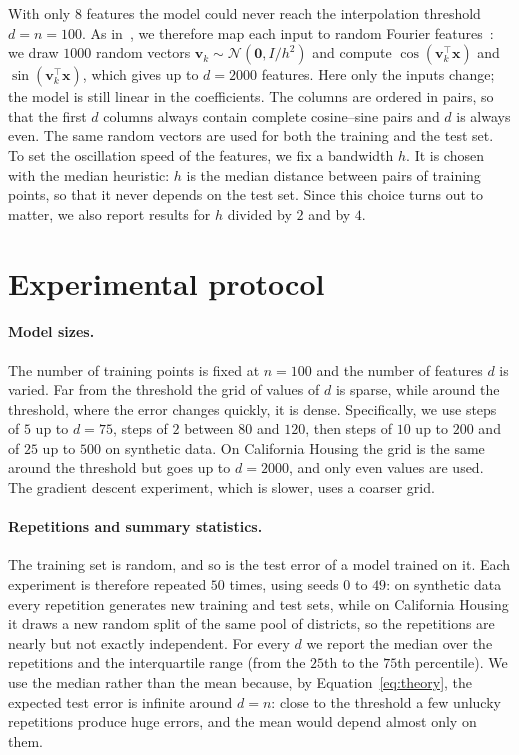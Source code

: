 \documentclass[11pt,a4paper]{article}
\begin{document}
With only $8$ features the model could never reach the interpolation
threshold $d = n = 100$. As in~\cite{belkin2019reconciling}, we therefore map
each input to random Fourier features~\cite{rahimi2007random}: we draw
$1000$ random vectors $\mathbf{v}_k \sim \mathcal{N}(\mathbf{0}, I / h^2)$
and compute $\cos(\mathbf{v}_k^\top \mathbf{x})$ and
$\sin(\mathbf{v}_k^\top \mathbf{x})$, which gives up to $d = 2000$ features.
Here only the inputs change; the model is still linear in the coefficients.
The columns are ordered in pairs, so that the first $d$ columns always
contain complete cosine--sine pairs and $d$ is always even. The same random vectors
are used for both the training and the test set. 
To set the oscillation speed of the features, we fix a bandwidth $h$. It is
chosen with the median heuristic: $h$ is the median distance between pairs
of training points, so that it never depends on the test set. Since this choice turns out to matter, 
we also report results for $h$ divided by $2$ and by $4$.

\section{Experimental protocol}

\paragraph{Model sizes.}
The number of training points is fixed at $n = 100$ and the number of
features $d$ is varied. 
Far from the threshold the grid of values of $d$ is sparse, while around the threshold,
where the error changes quickly, it is dense. Specifically, we use
steps of $5$ up to $d = 75$, steps of $2$ between $80$ and $120$, then steps of $10$ up
to $200$ and of $25$ up to $500$ on synthetic data. On California Housing
the grid is the same around the threshold but goes up to $d = 2000$, and only
even values are used. The gradient descent experiment, which is slower,
uses a coarser grid.

\paragraph{Repetitions and summary statistics.}
The training set is random, and so is the test error of a model trained on
it. Each experiment is therefore repeated $50$ times, using seeds $0$ to $49$:
on synthetic data every repetition generates new training and test sets,
while on California Housing it draws a new random split of the same pool of
districts, so the repetitions are nearly but not exactly independent.
For every $d$ we report the median over the repetitions and the interquartile 
range (from the $25$th to the $75$th percentile). 
We use the median rather than the mean because, by
Equation~\eqref{eq:theory}, the expected test error is infinite around
$d = n$: close to the threshold a few unlucky repetitions produce huge
errors, and the mean would depend almost only on them.
\end{document}

